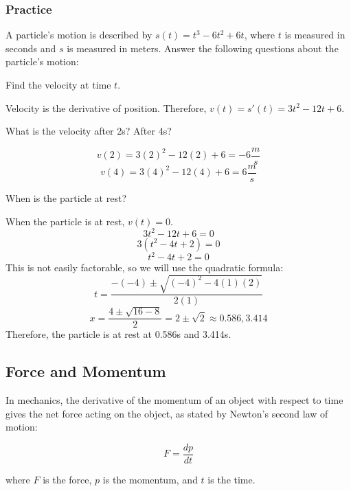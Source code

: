 \subsubsection{Practice}

A particle's motion is described by $s(t) = t^3-6t^2+6t$, where $t$ is measured in seconds and $s$ is measured in meters. Answer the following questions about the particle's motion:
\begin{Exercise}[label=velacc1]
Find the velocity at time $t$.
\end{Exercise}

\begin{Answer}[ref=velacc1]
Velocity is the derivative of position. Therefore, $v(t) = s'(t) = 3t^2-12t+6$.
\end{Answer}

\begin{Exercise}[label=velacc2]
What is the velocity after 2s? After 4s?
\end{Exercise}

\begin{Answer}[ref=velacc2]
$$v(2) = 3(2)^2-12(2)+6=-6 \frac{m}{s}$$
$$v(4) = 3(4)^2-12(4)+6=6\frac{m}{s}$$
\end{Answer}

\begin{Exercise}[label=velacc3]
When is the particle at rest?
\end{Exercise}

\begin{Answer}[ref=velacc3]
When the particle is at rest, $v(t) = 0$. 
$$3t^2-12t+6=0$$
$$3(t^2-4t+2)=0$$
$$t^2-4t+2=0$$
This is not easily factorable, so we will use the quadratic formula: $$t=\frac{-(-4)\pm\sqrt{(-4)^2-4(1)(2)}}{2(1)}$$
$$x=\frac{4\pm\sqrt{16-8}}{2}=2\pm\sqrt{2}\approx0.586, 3.414$$
Therefore, the particle is at rest at 0.586s and 3.414s.
\end{Answer}

\subsection{Force and Momentum}

In mechanics, the derivative of the momentum of an object with respect
to time gives the net force acting on the object, as stated by
Newton's second law of motion:

\begin{equation}
F = \frac{dp}{dt}
\end{equation}

where $F$ is the force, $p$ is the momentum, and $t$ is the time.

